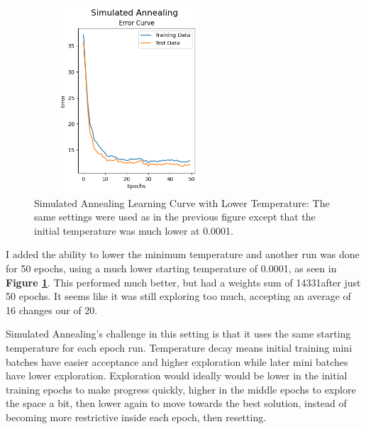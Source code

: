 \documentclass[letterpaper]{article} %
\begin{document}
\begin{figure}[!htb]
\centering
\includegraphics[width=2.75in, height=2.75in]{figures/Simulated_Annealing__epochs_50_temperature_0_0001_min_temp_1e_06_decay_geom_max_iters_20_max_attempts_5_seed_1_Error_Curve.png}
\caption{Simulated Annealing Learning Curve with Lower Temperature:  The same settings were used as in the previous figure except that the initial temperature was much lower at 0.0001.  }
\label{fig:nn_sa_adjusted}
\end{figure}

I added the ability to lower the minimum temperature and another run was done for 50 epochs, using a much lower starting temperature of 0.0001, as seen in  \textbf{Figure \ref{fig:nn_sa_adjusted}}.  This performed much better, but had a weights sum of 14331after just 50 epochs.  It seems like it was still exploring too much, accepting an average of 16 changes our of 20. 

Simulated Annealing's challenge in this setting is that it uses the same starting temperature for each epoch run.  Temperature decay means initial training mini batches have easier acceptance and higher exploration while later mini batches have lower exploration.  Exploration would ideally would be lower in the initial training epochs to make progress quickly,  higher in the middle epochs to explore the space a bit, then lower again to move towards the best solution, instead of becoming more restrictive inside each epoch, then resetting.
\end{document}
